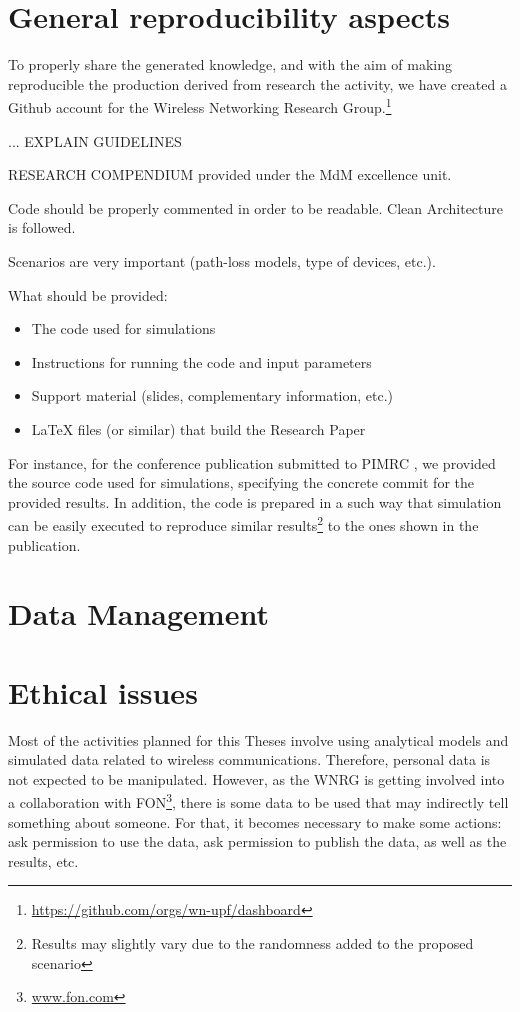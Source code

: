 \documentclass[12pt, a4paper,twoside]{article}
\begin{document}
	\section{General reproducibility aspects }
	\label{section:reproducibility}	
	
	To properly share the generated knowledge, and with the aim of making reproducible the production derived from research the activity, we have created a Github account for the Wireless Networking Research Group.\footnote{\url{https://github.com/orgs/wn-upf/dashboard}}
	
	... EXPLAIN GUIDELINES
	
	RESEARCH COMPENDIUM provided under the MdM excellence unit.
			
	Code should be properly commented in order to be readable. Clean Architecture is followed.	
	
	Scenarios are very important (path-loss models, type of devices, etc.).
		
	What should be provided:
	\begin{itemize}
		\item The code used for simulations
		\item Instructions for running the code and input parameters 
		\item Support material (slides, complementary information, etc.)
		\item LaTeX files (or similar) that build the Research Paper
	\end{itemize}		
			
	For instance, for the conference publication submitted to PIMRC \cite{wilhelmi2017implications}, we provided the source code used for simulations, specifying the concrete commit for the provided results. In addition, the code is prepared in a such way that simulation can be easily executed to reproduce similar results\footnote{Results may slightly vary due to the randomness added to the proposed scenario} to the ones shown in the publication.
	
	\section{Data Management}
	\label{section:data_mgm}	

	
	\section{Ethical issues}
	\label{section:ethical}		
	Most of the activities planned for this Theses involve using analytical models and simulated data related to wireless communications. Therefore, personal data is not expected to be manipulated. However, as the WNRG is getting involved into a collaboration with FON\footnote{\url{www.fon.com}}, there is some data to be used that may indirectly tell something about someone. For that, it becomes necessary to make some actions: ask permission to use the data, ask permission to publish the data, as well as the results, etc.
	
\end{document}

